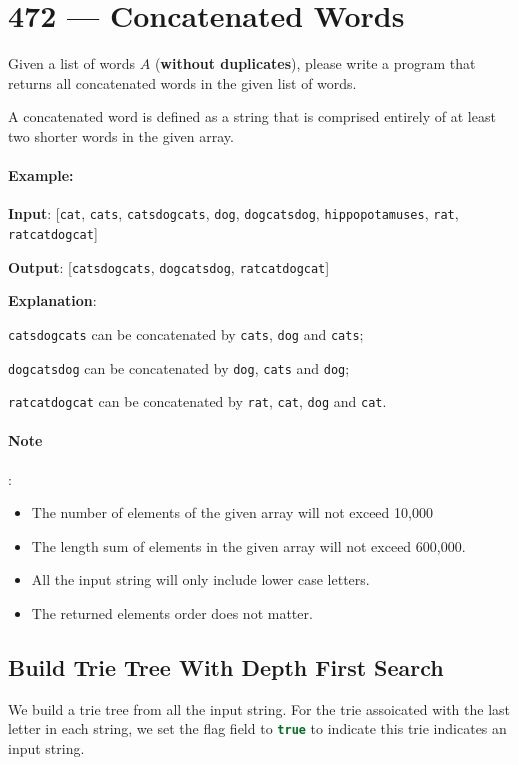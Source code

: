 \section{472 --- Concatenated Words}
Given a list of words $A$ (\textbf{without duplicates}), please write a program that returns all concatenated words in the given list of words.

A concatenated word is defined as a string that is comprised entirely of at least two shorter words in the given array.

\paragraph{Example:}

\begin{flushleft}
\textbf{Input}: [\texttt{cat}, \texttt{cats}, \texttt{catsdogcats}, \texttt{dog}, \texttt{dogcatsdog}, \texttt{hippopotamuses}, \texttt{rat}, \texttt{ratcatdogcat}]

\textbf{Output}: [\texttt{catsdogcats}, \texttt{dogcatsdog}, \texttt{ratcatdogcat}]

\textbf{Explanation}: 

\texttt{catsdogcats} can be concatenated by \texttt{cats}, \texttt{dog} and \texttt{cats}; 

\texttt{dogcatsdog} can be concatenated by \texttt{dog}, \texttt{cats} and \texttt{dog}; 

\texttt{ratcatdogcat} can be concatenated by \texttt{rat}, \texttt{cat}, \texttt{dog} and \texttt{cat}.

\end{flushleft}

\paragraph{Note}:
\begin{itemize}
\item The number of elements of the given array will not exceed 10,000
\item The length sum of elements in the given array will not exceed 600,000.
\item All the input string will only include lower case letters.
\item The returned elements order does not matter.
\end{itemize}

\subsection{Build Trie Tree With Depth First Search}
We build a trie tree from all the input string. For the trie assoicated with the last letter in each string, we set the flag field to \lstinline[language=C++, basicstyle=\small\ttfamily, keywordstyle=\bfseries\color{green!40!black}]|true| to indicate this trie indicates an input string.

